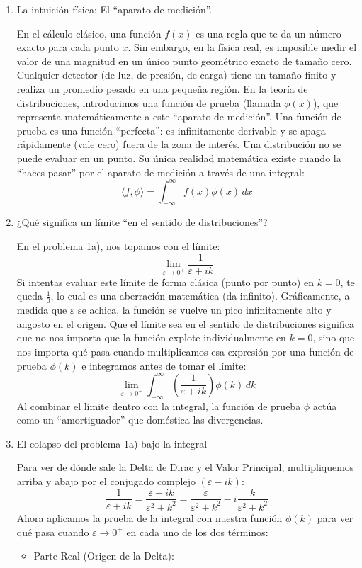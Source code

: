 \documentclass[11pt,spanish]{article}
\newcounter{problema}
\begin{document}
\begin{enumerate}
\item La intuición física: El ``aparato de medición''.

En el cálculo clásico, una función $f(x)$ es una regla que te da un número exacto para cada punto $x$. Sin embargo, en la física real, es imposible medir el valor de una magnitud en un único punto geométrico exacto de tamaño cero. Cualquier detector (de luz, de presión, de carga) tiene un tamaño finito y realiza un promedio pesado en una pequeña región.
En la teoría de distribuciones, introducimos una función de prueba (llamada $\phi(x)$), que representa matemáticamente a este ``aparato de medición''. Una función de prueba es una función ``perfecta'': es infinitamente derivable y se apaga rápidamente (vale cero) fuera de la zona de interés.
Una distribución no se puede evaluar en un punto. Su única realidad matemática existe cuando la ``haces pasar'' por el aparato de medición a través de una integral:
$$
\langle f, \phi \rangle = \int_{-\infty}^{\infty} f(x) \phi(x) \, dx
$$

\item ¿Qué significa un límite ``en el sentido de distribuciones''?

En el problema 1a), nos topamos con el límite:
$$
\lim_{\varepsilon \to 0^+} \frac{1}{\varepsilon + ik}
$$
Si intentas evaluar este límite de forma clásica (punto por punto) en $k=0$, te queda $\frac{1}{0}$, lo cual es una aberración matemática (da infinito). Gráficamente, a medida que $\varepsilon$ se achica, la función se vuelve un pico infinitamente alto y angosto en el origen.
Que el límite sea en el sentido de distribuciones significa que no nos importa que la función explote individualmente en $k=0$, sino que nos importa qué pasa cuando multiplicamos esa expresión por una función de prueba $\phi(k)$ e integramos antes de tomar el límite:
$$
\lim_{\varepsilon \to 0^+} \int_{-\infty}^{\infty} \left( \frac{1}{\varepsilon + ik} \right) \phi(k) \, dk
$$
Al combinar el límite dentro con la integral, la función de prueba $\phi$ actúa como un ``amortiguador'' que doméstica las divergencias.

\item El colapso del problema 1a) bajo la integral

Para ver de dónde sale la Delta de Dirac y el Valor Principal, multipliquemos arriba y abajo por el conjugado complejo $(\varepsilon - ik)$:
$$
\frac{1}{\varepsilon + ik} = \frac{\varepsilon - ik}{\varepsilon^2 + k^2} = \frac{\varepsilon}{\varepsilon^2 + k^2} - i \frac{k}{\varepsilon^2 + k^2}
$$
Ahora aplicamos la prueba de la integral con nuestra función $\phi(k)$ para ver qué pasa cuando $\varepsilon \to 0^+$ en cada uno de los dos términos:
\begin{itemize}
\item Parte Real (Origen de la Delta):


\end{itemize}
\end{enumerate}
\end{document}
